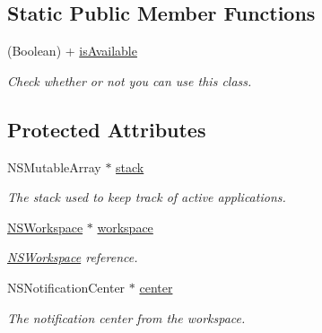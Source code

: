 \subsection*{Static Public Member Functions}
\begin{DoxyCompactItemize}
\item 
(Boolean) + \hyperlink{interface_g_d_active_application_stack_a10055d2ffec472e9413a8d84a7d8dd67}{isAvailable}
\begin{DoxyCompactList}\small\item\em Check whether or not you can use this class. \item\end{DoxyCompactList}\end{DoxyCompactItemize}
\subsection*{Protected Attributes}
\begin{DoxyCompactItemize}
\item 
\hypertarget{interface_g_d_active_application_stack_a6461f1d93e707a9d3ac8c777f81f7ff5}{
NSMutableArray $\ast$ \hyperlink{interface_g_d_active_application_stack_a6461f1d93e707a9d3ac8c777f81f7ff5}{stack}}
\label{interface_g_d_active_application_stack_a6461f1d93e707a9d3ac8c777f81f7ff5}

\begin{DoxyCompactList}\small\item\em The stack used to keep track of active applications. \item\end{DoxyCompactList}\item 
\hypertarget{interface_g_d_active_application_stack_a89a029b69eb31e0575e9148542f897cb}{
\hyperlink{class_n_s_workspace}{NSWorkspace} $\ast$ \hyperlink{interface_g_d_active_application_stack_a89a029b69eb31e0575e9148542f897cb}{workspace}}
\label{interface_g_d_active_application_stack_a89a029b69eb31e0575e9148542f897cb}

\begin{DoxyCompactList}\small\item\em \hyperlink{class_n_s_workspace}{NSWorkspace} reference. \item\end{DoxyCompactList}\item 
\hypertarget{interface_g_d_active_application_stack_a31c378be10427e3297886c016b5df980}{
NSNotificationCenter $\ast$ \hyperlink{interface_g_d_active_application_stack_a31c378be10427e3297886c016b5df980}{center}}
\label{interface_g_d_active_application_stack_a31c378be10427e3297886c016b5df980}

\begin{DoxyCompactList}\small\item\em The notification center from the workspace. \item\end{DoxyCompactList}\end{DoxyCompactItemize}
